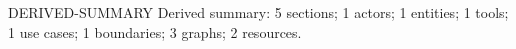 \documentclass[11pt,a4paper]{article}
\begin{document}
\begin{atlasderived}{DERIVED-SUMMARY}
Derived summary: 5 sections; 1 actors; 1 entities; 1 tools; 1 use cases; 1 boundaries; 3 graphs; 2 resources.
\end{atlasderived}
%
\end{document}
